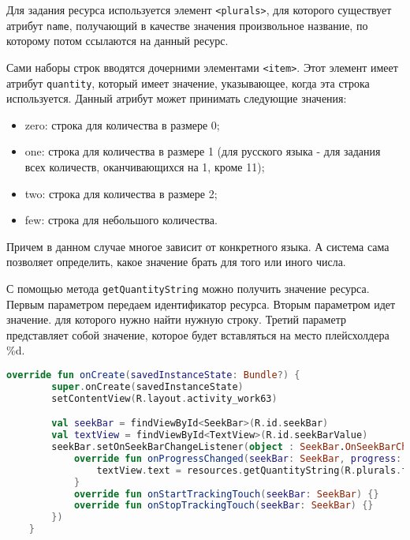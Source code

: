 
Для задания ресурса используется элемент \texttt{<plurals>}, для которого
существует атрибут \texttt{name}, получающий в качестве значения произвольное
название, по которому потом ссылаются на данный ресурс.\par
Сами наборы строк вводятся дочерними элементами \texttt{<item>}. Этот элемент
имеет атрибут \texttt{quantity}, который имеет значение, указывающее,
когда эта строка используется. Данный атрибут может принимать следующие
значения:

\begin{itemize}
	\item zero: строка для количества в размере 0;
	\item one: строка для количества в размере 1 (для русского языка - для
		задания всех количеств, оканчивающихся на 1, кроме 11);
	\item two: строка для количества в размере 2;
	\item few: строка для небольшого количества.
\end{itemize}

Причем в данном случае многое зависит от конкретного языка. А система
сама позволяет определить, какое значение брать для того или иного числа.

С помощью метода \texttt{getQuantityString} можно получить значение ресурса.
Первым параметром передаем идентификатор ресурса. Вторым параметром
идет значение. для которого нужно найти нужную строку. Третий параметр
представляет собой значение, которое будет вставляться на место
плейсхолдера \%d.\par

\begin{lstlisting}[language=Kotlin, caption=\leftline{спользование ресурсов Plurals в коде}, label=lst:kot:plurals]
override fun onCreate(savedInstanceState: Bundle?) {
        super.onCreate(savedInstanceState)
        setContentView(R.layout.activity_work63)

        val seekBar = findViewById<SeekBar>(R.id.seekBar)
        val textView = findViewById<TextView>(R.id.seekBarValue)
        seekBar.setOnSeekBarChangeListener(object : SeekBar.OnSeekBarChangeListener {
            override fun onProgressChanged(seekBar: SeekBar, progress: Int, fromUser: Boolean) {
                textView.text = resources.getQuantityString(R.plurals.flowers, progress, progress)
            }
            override fun onStartTrackingTouch(seekBar: SeekBar) {}
            override fun onStopTrackingTouch(seekBar: SeekBar) {}
        })
    }
\end{lstlisting}

